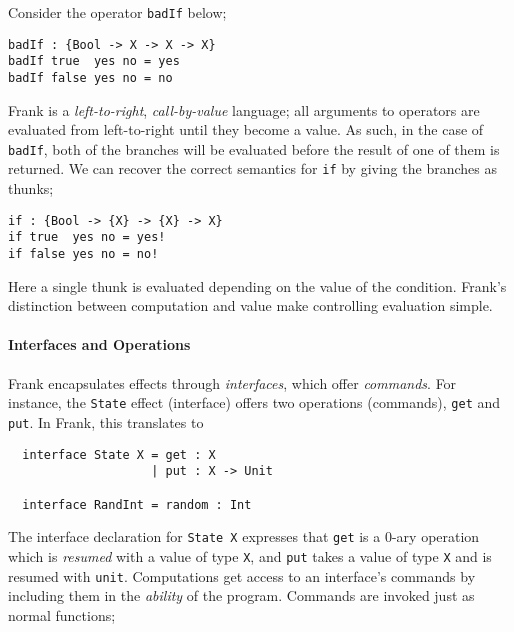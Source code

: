 \documentclass[msc,deptreport,cs]{infthesis} %
\newcommand{\code}[1]{\lstinline{#1}}
\newcommand{\todo}[1]
           {{\par\noindent\small\color{RoyalPurple}
  \framebox{\parbox{\dimexpr\linewidth-2\fboxsep-2\fboxrule}
    {\textbf{TODO:} #1}}}}
\begin{document}
Consider the operator \code{badIf} below;

\begin{lstlisting}
badIf : {Bool -> X -> X -> X}
badIf true  yes no = yes
badIf false yes no = no
\end{lstlisting}

\noindent Frank is a \emph{left-to-right}, \emph{call-by-value} language; all
arguments to operators are evaluated from left-to-right until they become a
value. As such, in the case of \code{badIf}, both of the branches will be
evaluated before the result of one of them is returned. We can recover the
correct semantics for \code{if} by giving the branches as thunks;

\begin{lstlisting}
if : {Bool -> {X} -> {X} -> X}
if true  yes no = yes!
if false yes no = no!
\end{lstlisting}

\noindent Here a single thunk is evaluated depending on the value of the
condition. Frank's distinction between computation and value make controlling
evaluation simple.



\paragraph*{Interfaces and Operations}

Frank encapsulates effects through \emph{interfaces}, which offer
\emph{commands}. For instance, the \code{State} effect (interface) offers two
operations (commands), \code{get} and \code{put}. In Frank, this translates to

\begin{lstlisting}
  interface State X = get : X
                    | put : X -> Unit

  interface RandInt = random : Int
\end{lstlisting}

The interface declaration for \code{State X} expresses that \code{get} is a
0-ary operation which is \emph{resumed} with a value of type \code{X}, and
\code{put} takes a value of type \code{X} and is resumed with \code{unit}.
Computations get access to an interface's commands by including them in the
\emph{ability} of the program. Commands are invoked just as normal functions;
\end{document}
